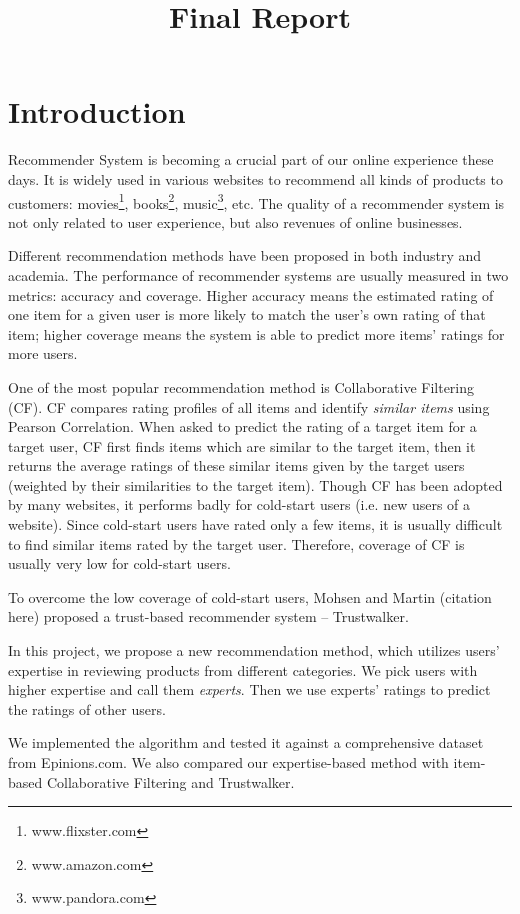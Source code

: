 \documentclass[12pt]{article}
\title{Final Report}
\author{}
\begin{document}
\maketitle

\section{Introduction}
Recommender System is becoming a crucial part of our online experience these days. It is widely used in various websites to recommend all kinds of products to customers: movies\footnote[1]{www.flixster.com}, books\footnote[2]{www.amazon.com}, music\footnote[3]{www.pandora.com}, etc. The quality of a recommender system is not only related to user experience, but also revenues of online businesses.  

Different recommendation methods have been proposed in both industry and academia. The performance of recommender systems are usually measured in two metrics: accuracy and coverage. Higher accuracy means the estimated rating of one item for a given user is more likely to match the user's own rating of that item; higher coverage means the system is able to predict more items' ratings for more users. 

One of the most popular recommendation method is Collaborative Filtering (CF). CF compares rating profiles of all items and identify \emph{similar items} using Pearson Correlation. When asked to predict the rating of a target item for a target user, CF first finds items which are similar to the target item, then it returns the average ratings of these similar items given by the target users (weighted by their similarities to the target item). Though CF has been adopted by many websites, it performs badly for cold-start users (i.e. new users of a website). Since cold-start users have rated only a few items, it is usually difficult to find similar items rated by the target user. Therefore, coverage of CF is usually very low for cold-start users. 

To overcome the low coverage of cold-start users, Mohsen and Martin (citation here) proposed a trust-based recommender system -- Trustwalker. 

In this project, we propose a new recommendation method, which utilizes users' expertise in reviewing products from different categories. We pick users with higher expertise and call them \emph{experts}. Then we use experts' ratings to predict the ratings of other users. 

We implemented the algorithm and tested it against a comprehensive dataset from Epinions.com. We also compared our expertise-based method with item-based Collaborative Filtering and Trustwalker. 
\end{document}
